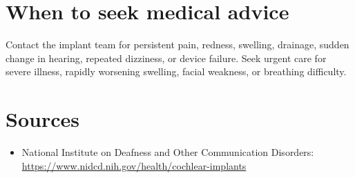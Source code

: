 \section*{When to seek medical advice}
Contact the implant team for persistent pain, redness, swelling, drainage, sudden change in hearing, repeated dizziness, or device failure. Seek urgent care for severe illness, rapidly worsening swelling, facial weakness, or breathing difficulty.

\section*{Sources}
\begin{itemize}
\item National Institute on Deafness and Other Communication Disorders: \url{https://www.nidcd.nih.gov/health/cochlear-implants}
\end{itemize}
